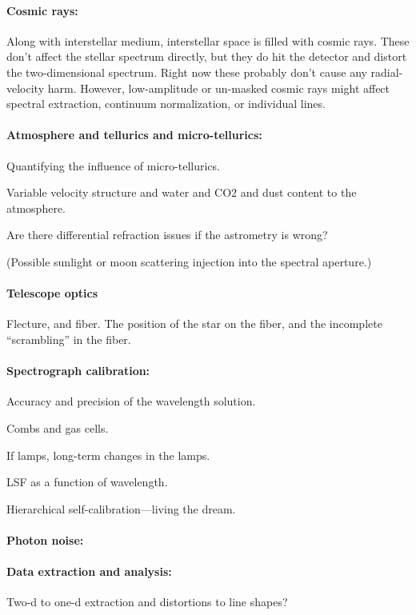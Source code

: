 \documentclass[12pt, fullpage, letterpaper]{article}
\begin{document}
\paragraph{Cosmic rays:}
Along with interstellar medium, interstellar space is filled with cosmic
rays.
These don't affect the stellar spectrum directly, but they do hit the detector
and distort the two-dimensional spectrum.
Right now these probably don't cause any radial-velocity harm.
However, low-amplitude or un-masked cosmic rays might affect spectral extraction,
continuum normalization, or individual lines.

\paragraph{Atmosphere and tellurics and micro-tellurics:}
Quantifying the influence of micro-tellurics.

Variable velocity structure and water and CO2 and dust content to the atmosphere.

Are there differential refraction issues if the astrometry is wrong?

(Possible sunlight or moon scattering injection into the spectral aperture.)

\paragraph{Telescope optics}
Flecture, and fiber. The position of the star on the fiber, and the
incomplete ``scrambling'' in the fiber.

\paragraph{Spectrograph calibration:}
Accuracy and precision of the wavelength solution.

Combs and gas cells.

If lamps, long-term changes in the lamps.

LSF as a function of wavelength.

Hierarchical self-calibration---living the dream.

\paragraph{Photon noise:}

\paragraph{Data extraction and analysis:}
Two-d to one-d extraction and distortions to line shapes?
\end{document}
